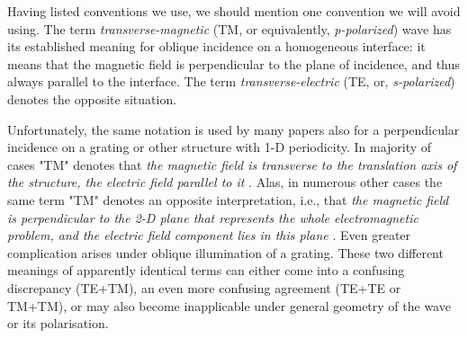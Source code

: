 Having listed conventions we use, we should mention one convention we will avoid using. The term \textit{transverse-magnetic} (TM, or equivalently, \textit{p-polarized}) wave has its established meaning for oblique incidence on a homogeneous interface: it means that the magnetic field is perpendicular to the plane of incidence, and thus always parallel to the interface. The term \textit{transverse-electric} (TE, or, \textit{s-polarized}) denotes the opposite situation. 

Unfortunately, the same notation is used by many papers also for a perpendicular incidence on a grating or other structure with 1-D periodicity. In majority of cases "TM" denotes that \textit{the magnetic field is transverse to the translation axis of the structure, the electric field parallel to it} \cite{joannopoulos2011photonic, rybin2014photonic}. Alas, in numerous other cases the same term "TM" denotes an opposite interpretation, i.e., that \textit{the magnetic field is perpendicular to the 2-D plane that represents the whole electromagnetic problem, and the electric field component lies in this plane} \cite{vynck2009all}. 
Even greater complication arises under oblique illumination of a grating. These two different meanings of apparently identical terms can either come into a confusing discrepancy (TE+TM), an even more confusing agreement (TE+TE or TM+TM), or may also become inapplicable under general geometry of the wave or its polarisation.


